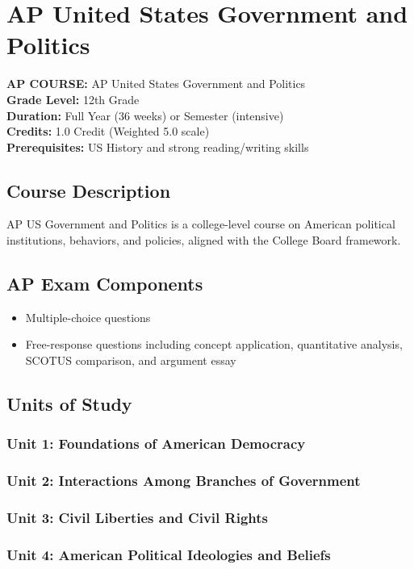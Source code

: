 \documentclass[12pt,oneside]{book}
\begin{document}
\chapter{AP United States Government and Politics}

\noindent\textbf{AP COURSE:} AP United States Government and Politics\\
\textbf{Grade Level:} 12th Grade\\
\textbf{Duration:} Full Year (36 weeks) or Semester (intensive)\\
\textbf{Credits:} 1.0 Credit (Weighted 5.0 scale)\\
\textbf{Prerequisites:} US History and strong reading/writing skills

\section{Course Description}
AP US Government and Politics is a college-level course on American political institutions,
behaviors, and policies, aligned with the College Board framework.

\section{AP Exam Components}
\begin{itemize}[leftmargin=2em]
    \item Multiple-choice questions
    \item Free-response questions including concept application, quantitative analysis, SCOTUS comparison, and argument essay
\end{itemize}

\section{Units of Study}
\subsection*{Unit 1: Foundations of American Democracy}
\subsection*{Unit 2: Interactions Among Branches of Government}
\subsection*{Unit 3: Civil Liberties and Civil Rights}
\subsection*{Unit 4: American Political Ideologies and Beliefs}
\end{document}
